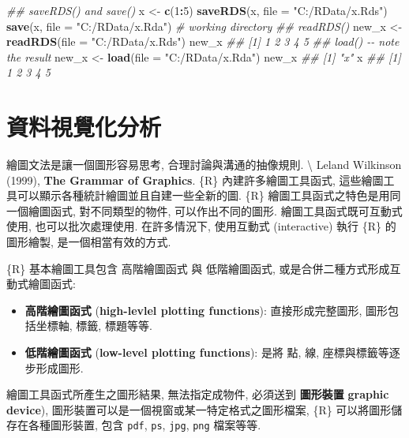 \documentclass[
]{book}
\newenvironment{Shaded}{\begin{snugshade}}{\end{snugshade}}
\newcommand{\CommentTok}[1]{\textcolor[rgb]{0.56,0.35,0.01}{\textit{#1}}}
\newcommand{\DataTypeTok}[1]{\textcolor[rgb]{0.13,0.29,0.53}{#1}}
\newcommand{\DecValTok}[1]{\textcolor[rgb]{0.00,0.00,0.81}{#1}}
\newcommand{\KeywordTok}[1]{\textcolor[rgb]{0.13,0.29,0.53}{\textbf{#1}}}
\newcommand{\NormalTok}[1]{#1}
\newcommand{\OperatorTok}[1]{\textcolor[rgb]{0.81,0.36,0.00}{\textbf{#1}}}
\newcommand{\StringTok}[1]{\textcolor[rgb]{0.31,0.60,0.02}{#1}}
\providecommand{\tightlist}{%
  \setlength{\itemsep}{0pt}\setlength{\parskip}{0pt}}
\begin{document}
\begin{Shaded}
\begin{Highlighting}[]
\CommentTok{\#\# saveRDS() and save()}
\NormalTok{x \textless{}{-}}\StringTok{ }\KeywordTok{c}\NormalTok{(}\DecValTok{1}\OperatorTok{:}\DecValTok{5}\NormalTok{)}
\KeywordTok{saveRDS}\NormalTok{(x, }\DataTypeTok{file =} \StringTok{"C:/RData/x.Rds"}\NormalTok{)}
\KeywordTok{save}\NormalTok{(x, }\DataTypeTok{file =} \StringTok{"C:/RData/x.Rda"}\NormalTok{)   }\CommentTok{\# working directory}
\CommentTok{\#\# readRDS()}
\NormalTok{new\_x \textless{}{-}}\StringTok{ }\KeywordTok{readRDS}\NormalTok{(}\DataTypeTok{file =} \StringTok{"C:/RData/x.Rds"}\NormalTok{)}
\NormalTok{new\_x}
\CommentTok{\#\# [1] 1 2 3 4 5}
\CommentTok{\#\# load() {-}{-} note the result}
\NormalTok{new\_x \textless{}{-}}\StringTok{ }\KeywordTok{load}\NormalTok{(}\DataTypeTok{file =} \StringTok{"C:/RData/x.Rda"}\NormalTok{)}
\NormalTok{new\_x}
\CommentTok{\#\# [1] "x"}
\NormalTok{x}
\CommentTok{\#\# [1] 1 2 3 4 5}
\end{Highlighting}
\end{Shaded}

\hypertarget{ux8cc7ux6599ux8996ux89baux5316ux5206ux6790}{%
\chapter{資料視覺化分析}\label{ux8cc7ux6599ux8996ux89baux5316ux5206ux6790}}

繪圖文法是讓一個圖形容易思考, 合理討論與溝通的抽像規則. \textbackslash{}
Leland Wilkinson (1999),
\textbf{The Grammar of Graphics}.
\{R\} 內建許多繪圖工具函式,
這些繪圖工具可以顯示各種統計繪圖並且自建一些全新的圖.
\{R\} 繪圖工具函式之特色是用同一個繪圖函式, 對不同類型的物件,
可以作出不同的圖形.
繪圖工具函式既可互動式使用, 也可以批次處理使用.
在許多情況下, 使用互動式 (interactive)
執行 \{R\} 的圖形繪製, 是一個相當有效的方式.

\{R\} 基本繪圖工具包含 高階繪圖函式 與 低階繪圖函式, 或是合併二種方式形成互動式繪圖函式:

\begin{itemize}
\tightlist
\item
  \textbf{高階繪圖函式}
  (\textbf{high-levlel plotting functions}):
  直接形成完整圖形, 圖形包括坐標軸, 標籤, 標題等等.
\item
  \textbf{低階繪圖函式}
  (\textbf{low-level plotting functions}):
  是將 點, 線, 座標與標籤等逐步形成圖形.
\end{itemize}

繪圖工具函式所產生之圖形結果,
無法指定成物件,
必須送到
\textbf{圖形裝置}
\textbf{graphic device}),
圖形裝置可以是一個視窗或某一特定格式之圖形檔案,
\{R\} 可以將圖形儲存在各種圖形裝置,
包含 \texttt{pdf}, \texttt{ps}, \texttt{jpg}, \texttt{png} 檔案等等.
\end{document}

